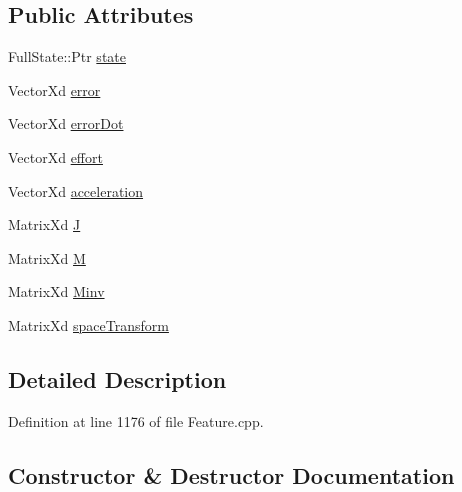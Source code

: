 \subsection*{Public Attributes}
\begin{DoxyCompactItemize}
\item 
Full\+State\+::\+Ptr \hyperlink{structocra_1_1FullStateFeature_1_1Pimpl_a4561279776ecf9adda446067000e3536}{state}
\item 
Vector\+Xd \hyperlink{structocra_1_1FullStateFeature_1_1Pimpl_a37accc4269498c113d450b0106115274}{error}
\item 
Vector\+Xd \hyperlink{structocra_1_1FullStateFeature_1_1Pimpl_aea594214dbcf9bd9c7fb28b16593df7e}{error\+Dot}
\item 
Vector\+Xd \hyperlink{structocra_1_1FullStateFeature_1_1Pimpl_a7e2566a7756280de4327e405cab53956}{effort}
\item 
Vector\+Xd \hyperlink{structocra_1_1FullStateFeature_1_1Pimpl_affdd50d872fa8b7fb0da46f5193e3853}{acceleration}
\item 
Matrix\+Xd \hyperlink{structocra_1_1FullStateFeature_1_1Pimpl_aaf69c11e2ad69ab31c1b6614dec068bd}{J}
\item 
Matrix\+Xd \hyperlink{structocra_1_1FullStateFeature_1_1Pimpl_ae2b1ab14e57380beb59d953ab4e72045}{M}
\item 
Matrix\+Xd \hyperlink{structocra_1_1FullStateFeature_1_1Pimpl_add9febc56f82bdd70913af436e2a32ef}{Minv}
\item 
Matrix\+Xd \hyperlink{structocra_1_1FullStateFeature_1_1Pimpl_a365838ffac9d0f8710c86493f04aa084}{space\+Transform}
\end{DoxyCompactItemize}


\subsection{Detailed Description}


Definition at line 1176 of file Feature.\+cpp.



\subsection{Constructor \& Destructor Documentation}
\hypertarget{structocra_1_1FullStateFeature_1_1Pimpl_a535c4bad2a46c4c31f3b6aa052564b16}{}\label{structocra_1_1FullStateFeature_1_1Pimpl_a535c4bad2a46c4c31f3b6aa052564b16} 
